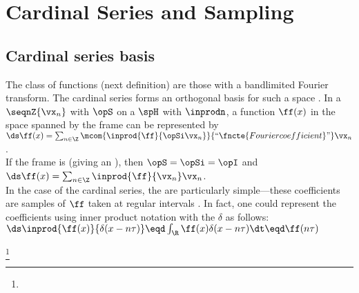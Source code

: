 \section{Cardinal Series and Sampling}
\subsection{Cardinal series basis}
\label{sec:cardinal}
The  class of functions (next definition) are those with a bandlimited Fourier transform.
The cardinal series forms an orthogonal basis for such a space .
In a  $\seqnZ{\vx_n}$ with  $\opS$ on a  $\spH$
with  $\inprodn$, 
a function $\ff(x)$ in the space spanned by the frame can be represented by
\\\indentx$\ds\ff(x) = \sum_{n\in\Z} \mcom{\inprod{\ff}{\opSi\vx_n}}{``\fncte{Fourier coefficient}"}\vx_n$.\\
If the frame is  (giving an ), then $\opS=\opSi=\opI$ and 
\\\indentx$\ds\ff(x) = \sum_{n\in\Z} \inprod{\ff}{\vx_n}\vx_n$.\\
In the case of the cardinal series, 
the  are particularly 
simple---these coefficients are samples of $\ff$ taken at regular intervals .
In fact, one could represent the coefficients using inner product notation with the 
 $\delta$  as
follows:
\\\indentx$\ds\inprod{\ff(x)}{\delta(x-n\tau)} \eqd \int_{\R} \ff(x)\delta(x-n\tau) \dt \eqd \ff(n\tau)$

\begin{definition}
\footnote{
  }
\label{def:PW}
\end{definition}


